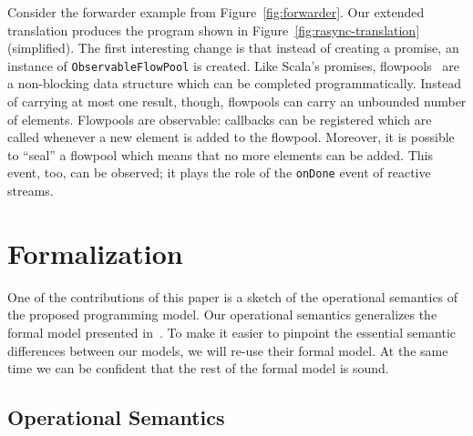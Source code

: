 \documentclass{acm_proc_article-sp}
\begin{document}
Consider the forwarder example from Figure~\ref{fig:forwarder}. Our extended
translation produces the program shown in Figure~\ref{fig:rasync-translation}
(simplified). The first interesting change is that instead of creating a
promise, an instance of \verb|ObservableFlowPool| is created. Like Scala's
promises, flowpools~\cite{ProkopecMSHO12} are a non-blocking data structure
which can be completed programmatically. Instead of carrying at most one
result, though, flowpools can carry an unbounded number of elements. Flowpools
are observable: callbacks can be registered which are called whenever a new
element is added to the flowpool. Moreover, it is possible to ``seal'' a
flowpool which means that no more elements can be added. This event, too, can
be observed; it plays the role of the \verb|onDone| event of reactive streams.


\section{Formalization}

One of the contributions of this paper is a sketch of the operational semantics of the
proposed programming model. Our operational semantics generalizes the formal
model presented in~\cite{FormalizingAsync}. To make it easier to pinpoint the essential
semantic differences between our models, we will re-use their formal model.
At the same time we can be confident that the rest of the formal model is sound.

\subsection{Operational Semantics}
\end{document}
